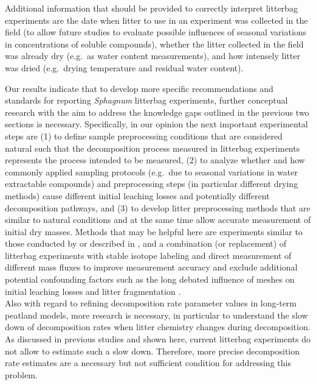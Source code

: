 \documentclass[bg, manuscript]{copernicus}
\begin{document}
Additional information that should be provided to correctly interpret litterbag experiments are the date when litter to use in an experiment was collected in the field (to allow future studies to evaluate possible influences of seasonal variations in concentrations of soluble compounds), whether the litter collected in the field was already dry (e.g.~as water content measurements), and how intensely litter was dried (e.g.~drying temperature and residual water content).

Our results indicate that to develop more specific recommendations and standards for reporting \emph{Sphagnum} litterbag experiments, further conceptual research with the aim to address the knowledge gaps outlined in the previous two sections is necessary. Specifically, in our opinion the next important experimental steps are (1) to define sample preprocessing conditions that are considered natural such that the decomposition process measured in litterbag experiments represents the process intended to be measured, (2) to analyze whether and how commonly applied sampling protocols (e.g.~due to seasonal variations in water extractable compounds) and preprocessing steps (in particular different drying methods) cause different initial leaching losses and potentially different decomposition pathways, and (3) to develop litter preprocessing methods that are similar to natural conditions and at the same time allow accurate measurement of initial dry masses. Methods that may be helpful here are experiments similar to those conducted by \citet{Lind.2022} or described in \citet{Barlocher.1997}, and a combination (or replacement) of litterbag experiments with stable isotope labeling and direct measurement of different mass fluxes \citep[e.g.,][]{Kammer.2011, Cotrufo.2015} to improve measurement accuracy and exclude additional potential confounding factors such as the long debated influence of meshes on initial leaching losses and litter fragmentation \citep[e.g.,][]{Bokhorst.2013}.\\
Also with regard to refining decomposition rate parameter values in long-term peatland models, more research is necessary, in particular to understand the slow down of decomposition rates when litter chemistry changes during decomposition. As discussed in previous studies \citep[\citet{Frolking.2001}]{Clymo.1998} and shown here, current litterbag experiments do not allow to estimate such a slow down. Therefore, more precise decomposition rate estimates are a necessary but not sufficient condition for addressing this problem.
\end{document}
